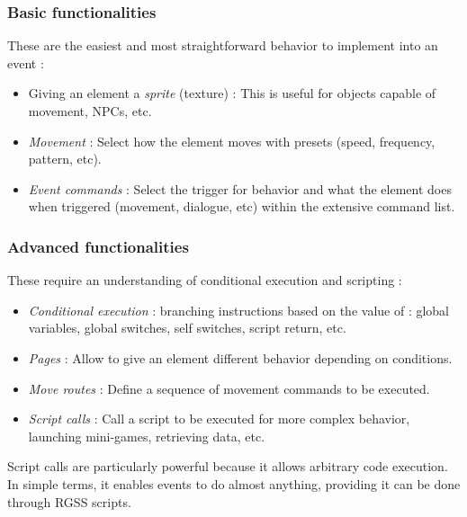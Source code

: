\documentclass[11pt]{article}
\begin{document}
{\subsubsection{Basic functionalities}

These are the easiest and most straightforward behavior to implement into an event :

\begin{itemize}
	\item Giving an element a \textit{sprite} (texture) : This is useful for objects capable of movement, NPCs, etc.
	
	\item \textit{Movement} : Select how the element moves with presets (speed, frequency, pattern, etc).
	
	\item \textit{Event commands} : Select the trigger for behavior and what the element does when triggered (movement, dialogue, etc) within the extensive command list.
\end{itemize}

\subsubsection{Advanced functionalities}

These require an understanding of conditional execution and scripting :

\begin{itemize}
	\item \textit{Conditional execution} : branching instructions based on the value of : global variables, global switches, self switches, script return, etc.
	
	\item \textit{Pages} : Allow to give an element different behavior depending on conditions.
	
	\item \textit{Move routes} : Define a sequence of movement commands to be executed.
	
	\item \textit{Script calls} : Call a script to be executed for more complex behavior, launching mini-games, retrieving data, etc.
\end{itemize}

Script calls are particularly powerful because it allows arbitrary code execution. In simple terms, it enables events to do almost anything, providing it can be done through RGSS scripts.



}
\end{document}
